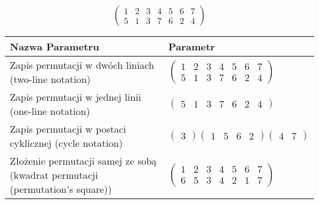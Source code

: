 \documentclass[12pt]{article}
\begin{document}
\subsection{}
\begin{center}
\[
\begin{pmatrix}
	1 & 2 & 3 & 4 & 5 & 6 & 7 \\ 
	5 & 1 & 3 & 7 & 6 & 2 & 4 
\end{pmatrix}
\]

\begin{tabular}{|m{0.6\linewidth}|m{0.4\linewidth}|}
	\hline
	Nazwa Parametru & Parametr \\
	\hline
	Zapis permutacji w dwóch liniach (two-line notation) & $\begin{pmatrix} 1 & 2 & 3 & 4 & 5 & 6 & 7 \\ 
5 & 1 & 3 & 7 & 6 & 2 & 4 \end{pmatrix}$ \\ 
	\hline
	Zapis permutacji w jednej linii (one-line notation) & $\begin{pmatrix} 5 & 1 & 3 & 7 & 6 & 2 & 4 \end{pmatrix}$ \\ 
	\hline
	Zapis permutacji w postaci cyklicznej (cycle notation) & $\begin{pmatrix} 3 \end{pmatrix} \begin{pmatrix} 1 & 5 & 6 & 2 \end{pmatrix} \begin{pmatrix} 4 & 7 \end{pmatrix} $ \\ 
	\hline
	Złożenie permutacji samej ze sobą (kwadrat permutacji (permutation's square)) & $\begin{pmatrix} 1 & 2 & 3 & 4 & 5 & 6 & 7 \\ 
6 & 5 & 3 & 4 & 2 & 1 & 7 \end{pmatrix}$ \\ 
	\hline
\end{tabular}
\end{center}
\end{document}
